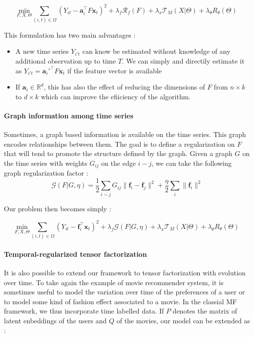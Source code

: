 \documentclass{article}
\begin{document}
\begin{equation}
\underset{F,X,\Theta}{\text{min}} \sum_{(i,t) \in \Omega} (Y_{it} - \mathbf{a}_i^\top F \mathbf{x}_t)^2 + \lambda_f \mathcal{R}_f(F) + \lambda_x \mathcal{T}_M(X | \Theta) + \lambda_{\theta} R_{\theta}(\Theta)
\label{eq:model_feature}
\end{equation}

This formulation has two main advantages :
\begin{itemize}
\item A new time series $Y_{i't}$ can know be estimated without knowledge of any additional observation up to time $T$. We can simply and directily estimate it as $Y_{i't} = \mathbf{a}_i'^\top F \mathbf{x}_t$ if the feature vector is available
\item If $\mathbf{a}_i \in \mathbb{R}^d$, this has also the effect of reducing the dimensions of $F$ from $n \times k$ to $d \times k$ which can improve the efiiciency of the algorithm.
\end{itemize}

\paragraph{Graph information among time series}
Sometimes, a graph based information is available on the time series. This graph encodes relationships between them. The goal is to define a regularization on $F$ that will tend to promote the structure defined by the graph.
Given a graph $G$ on the time series with weights $G_{ij}$ on the edge $i-j$, we can take the following graph regularization factor :
$$\mathcal{G}(F|G,\eta) = \frac{1}{2}\sum_{i\sim j}G_{ij}\|\mathbf{f}_i - \mathbf{f}_j\|^2 + \frac{\eta}{2}\sum_i \|\mathbf{f}_i\|^2$$

Our problem then becomes simply :

\begin{equation}
\underset{F,X,\Theta}{\text{min}} \sum_{(i,t) \in \Omega} (Y_{it} - \mathbf{f}_i^\top\mathbf{x}_t)^2 + \lambda_f \mathcal{G}(F|G,\eta) + \lambda_x \mathcal{T}_M(X | \Theta) + \lambda_{\theta} R_{\theta}(\Theta)
\label{eq:model_graph}
\end{equation}

\paragraph{Temporal-regularized tensor factorization}
It is also possible to extend our framework to tensor factorization with evolution over time. To take again the example of movie recommender system, it is sometimes useful to model the variation over time of the preferences of a user or to model some kind of fashion effect associated to a movie. In the classial MF framework, we thus incorporate time labelled data. If $P$ denotes the matrix of latent enbeddings of the users and $Q$ of the movies, our model can be extended as :
\end{document}
